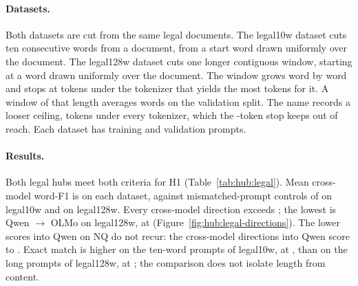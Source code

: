 \paragraph{Datasets.} Both datasets are cut from the same legal documents.
The legal10w dataset cuts ten consecutive words from a document, from a start word drawn uniformly over the document. %
The legal128w dataset cuts one longer contiguous window, starting at a word drawn uniformly over the document.
The window grows word by word and stops at  tokens under the tokenizer that yields the most tokens for it. %
A window of that length averages  words on the validation split. %
The name records a looser ceiling,  tokens under every tokenizer, which the -token stop keeps out of reach. %
Each dataset has  training and  validation prompts. %

\paragraph{Results.} Both legal hubs meet both criteria for H1 (Table~\ref{tab:hub:legal}).
Mean cross-model word-F1 is  on each dataset, against mismatched-prompt controls of  on legal10w and  on legal128w. %
Every cross-model direction exceeds ; the lowest is Qwen $\to$ OLMo on legal128w, at  (Figure~\ref{fig:hub:legal-directions}). %
The lower scores into Qwen on NQ do not recur: the cross-model directions into Qwen score  to . %
Exact match is higher on the ten-word prompts of legal10w, at , than on the long prompts of legal128w, at ; the comparison does not isolate length from content.

